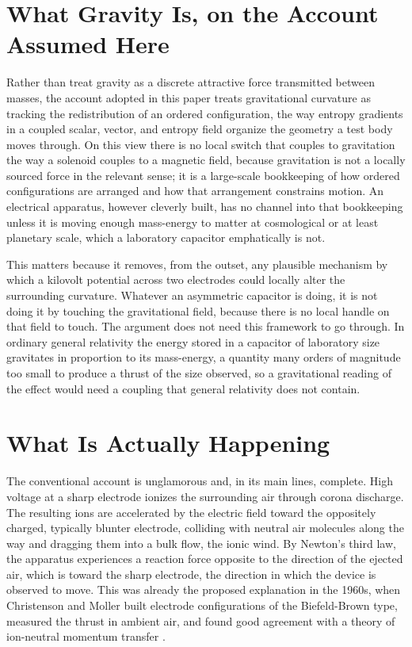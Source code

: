 \documentclass[11pt]{article}
\begin{document}
\section{What Gravity Is, on the Account Assumed Here}

Rather than treat gravity as a discrete attractive force transmitted between masses, the account adopted in this paper treats gravitational curvature as tracking the redistribution of an ordered configuration, the way entropy gradients in a coupled scalar, vector, and entropy field organize the geometry a test body moves through. On this view there is no local switch that couples to gravitation the way a solenoid couples to a magnetic field, because gravitation is not a locally sourced force in the relevant sense; it is a large-scale bookkeeping of how ordered configurations are arranged and how that arrangement constrains motion. An electrical apparatus, however cleverly built, has no channel into that bookkeeping unless it is moving enough mass-energy to matter at cosmological or at least planetary scale, which a laboratory capacitor emphatically is not.

This matters because it removes, from the outset, any plausible mechanism by which a kilovolt potential across two electrodes could locally alter the surrounding curvature. Whatever an asymmetric capacitor is doing, it is not doing it by touching the gravitational field, because there is no local handle on that field to touch. The argument does not need this framework to go through. In ordinary general relativity the energy stored in a capacitor of laboratory size gravitates in proportion to its mass-energy, a quantity many orders of magnitude too small to produce a thrust of the size observed, so a gravitational reading of the effect would need a coupling that general relativity does not contain.

\section{What Is Actually Happening}

The conventional account is unglamorous and, in its main lines, complete. High voltage at a sharp electrode ionizes the surrounding air through corona discharge. The resulting ions are accelerated by the electric field toward the oppositely charged, typically blunter electrode, colliding with neutral air molecules along the way and dragging them into a bulk flow, the ionic wind. By Newton's third law, the apparatus experiences a reaction force opposite to the direction of the ejected air, which is toward the sharp electrode, the direction in which the device is observed to move. This was already the proposed explanation in the 1960s, when Christenson and Moller built electrode configurations of the Biefeld-Brown type, measured the thrust in ambient air, and found good agreement with a theory of ion-neutral momentum transfer \cite{CM1967}.
\end{document}
